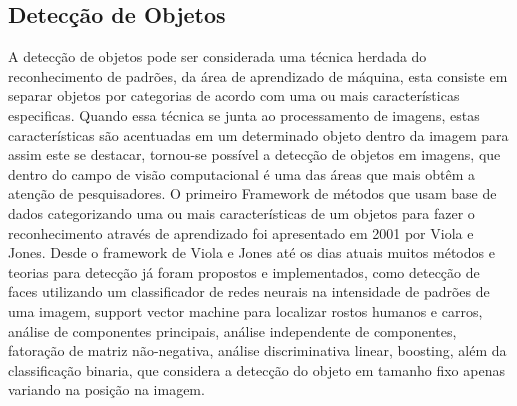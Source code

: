 \subsection{Detecção de Objetos}
\label{Sec:TiposDeDeteccaoDeObjetos}
	

A detecção de objetos pode ser considerada uma técnica herdada do reconhecimento de padrões, da área de aprendizado de máquina, esta consiste em separar objetos por categorias de acordo com uma ou mais características especificas. Quando essa técnica se junta ao processamento de imagens, estas características são acentuadas em um determinado objeto dentro da imagem para assim este se destacar, tornou-se possível a detecção de objetos em imagens, que dentro do campo de visão computacional é uma das áreas que mais obtêm a atenção de pesquisadores. 
O primeiro Framework de métodos que usam base de dados categorizando uma ou mais características de um objetos para fazer o reconhecimento através de aprendizado foi apresentado em 2001 por Viola e Jones\cite{Viola:2001}. Desde o framework de Viola e Jones até os dias atuais muitos métodos e teorias para detecção já foram propostos e implementados, como detecção de faces utilizando um classificador de redes neurais na intensidade de padrões de uma imagem, support vector machine para localizar rostos humanos e carros\cite{Nascimento:2007}, análise de componentes principais, análise independente de componentes, fatoração de matriz não-negativa, análise discriminativa linear, boosting\cite{Roth:2008}, além da classificação binaria, que considera a detecção do objeto em tamanho fixo apenas variando na posição na imagem\cite{AmitFelzenszwalb:2014}. 


